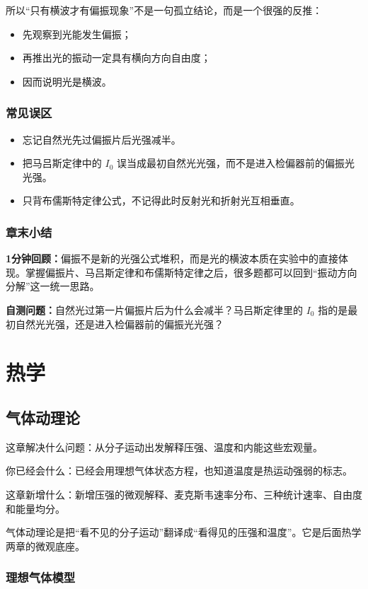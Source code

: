\documentclass[lang=cn,11pt]{elegantbook}
\newcommand{\bridge}[1]{\begin{note}#1\end{note}}
\newcommand{\chapterroadmap}[3]{%
\begin{introduction}
  \item {\heiti 这章解决什么问题：}#1
  \item {\heiti 你已经会什么：}#2
  \item {\heiti 这章新增什么：}#3
\end{introduction}}
\newcommand{\summaryline}[1]{\par\noindent\textbf{1分钟回顾：}#1\par}
\newcommand{\chapterselfcheck}[1]{\par\noindent\textbf{自测问题：}#1\par}
\begin{document}
\begin{note}
所以“只有横波才有偏振现象”不是一句孤立结论，而是一个很强的反推：
\begin{itemize}
  \item 先观察到光能发生偏振；
  \item 再推出光的振动一定具有横向方向自由度；
  \item 因而说明光是横波。
\end{itemize}
\end{note}

\section{常见误区}

\begin{itemize}
  \item 忘记自然光先过偏振片后光强减半。
  \item 把马吕斯定律中的 \(I_0\) 误当成最初自然光光强，而不是进入检偏器前的偏振光光强。
  \item 只背布儒斯特定律公式，不记得此时反射光和折射光互相垂直。
\end{itemize}

\section{章末小结}

\summaryline{偏振不是新的光强公式堆积，而是光的横波本质在实验中的直接体现。掌握偏振片、马吕斯定律和布儒斯特定律之后，很多题都可以回到“振动方向分解”这一统一思路。}
\chapterselfcheck{自然光过第一片偏振片后为什么会减半？马吕斯定律里的 \(I_0\) 指的是最初自然光光强，还是进入检偏器前的偏振光光强？}

\part{热学}

\chapter{气体动理论}

\chapterroadmap
{从分子运动出发解释压强、温度和内能这些宏观量。}
{已经会用理想气体状态方程，也知道温度是热运动强弱的标志。}
{新增压强的微观解释、麦克斯韦速率分布、三种统计速率、自由度和能量均分。}

\bridge{气体动理论是把“看不见的分子运动”翻译成“看得见的压强和温度”。它是后面热学两章的微观底座。}

\section{理想气体模型}
\end{document}
